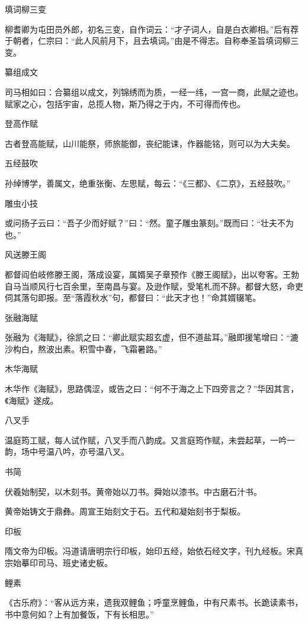 \documentclass[a4paper,12pt,UTF8,twoside]{ctexbook}
\begin{document}
    填词柳三变
    
    柳耆卿为屯田员外郎，初名三变，自作词云：“才子词人，自是白衣卿相。”后有荐于朝者，仁宗曰：“此人风前月下，且去填词。”由是不得志。自称奉圣旨填词柳三变。
    
    纂组成文
    
    司马相如曰：合纂组以成文，列锦绣而为质，一经一纬，一宫一商，此赋之迹也。赋家之心，包括宇宙，总揽人物，斯乃得之于内，不可得而传也。
    
    登高作赋
    
    古者登高能赋，山川能祭，师旅能御，丧纪能诔，作器能铭，则可以为大夫矣。
    
    五经鼓吹
    
    孙绰博学，善属文，绝重张衡、左思赋，每云：“《三都》、《二京》，五经鼓吹。”
    
    雕虫小技
    
    或问扬子云曰：“吾子少而好赋？”曰：“然。童子雕虫篆刻。”既而曰：“壮夫不为也。”
    
    风送滕王阁
    
    都督阎伯岐修滕王阁，落成设宴，属婿吴子章预作《滕王阁赋》，出以夸客。王勃自马当顺风行七百余里，至南昌与宴。及逊作赋，受笔札而不辞。都督大怒，命吏伺其落句即报。至“落霞秋水”句，都督曰：“此天才也！”命其婿辍笔。
    
    张融海赋
    
    张融为《海赋》，徐凯之曰：“卿此赋实超玄虚，但不道盐耳。”融即援笔增曰：“漉沙构白，熬波出素。积雪中春，飞霜暑路。”
    
    木华海赋
    
    木华作《海赋》，思路偶涩，或告之曰：“何不于海之上下四旁言之？”华因其言，《海赋》遂成。
    
    八叉手
    
    温庭筠工赋，每人试作赋，八叉手而八韵成。又言庭筠作赋，未尝起草，一吟一韵，场中号温八吟，亦号温八叉。
    
    书简
    
    伏羲始制契，以木刻书。黄帝始以刀书。舜始以漆书。中古磨石汁书。
    
    黄帝始铸文于鼎彝。周宣王始刻文于石。五代和凝始刻书于梨板。
    
    印板
    
    隋文帝为印板。冯道请唐明宗行印板，始印五经，始依石经文字，刊九经板。宋真宗始摹印司马、班史诸史板。
    
    鲤素
    
    《古乐府》：“客从远方来，遗我双鲤鱼；呼童烹鲤鱼，中有尺素书。长跪读素书，书中意何如？上有加餐饭，下有长相思。”
    
\end{document}
